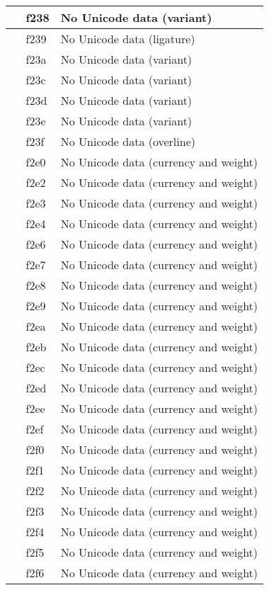 \documentclass[12pt,letterpaper,openany]{book}
\begin{document}
\begin{center}
\begin{supertabular}{|m{0.25in}|m{0.5in}|m{4in}|}
 & f238 & No Unicode data (variant)\\\hline
 & f239 & No Unicode data (ligature)\\\hline
 & f23a & No Unicode data (variant)\\\hline
 & f23c & No Unicode data (variant)\\\hline
 & f23d & No Unicode data (variant)\\\hline
 & f23e & No Unicode data (variant)\\\hline
 & f23f & No Unicode data (overline)\\\hline
 & f2e0 & No Unicode data (currency and weight)\\\hline
 & f2e2 & No Unicode data (currency and weight)\\\hline
 & f2e3 & No Unicode data (currency and weight)\\\hline
 & f2e4 & No Unicode data (currency and weight)\\\hline
 & f2e6 & No Unicode data (currency and weight)\\\hline
 & f2e7 & No Unicode data (currency and weight)\\\hline
 & f2e8 & No Unicode data (currency and weight)\\\hline
 & f2e9 & No Unicode data (currency and weight)\\\hline
 & f2ea & No Unicode data (currency and weight)\\\hline
 & f2eb & No Unicode data (currency and weight)\\\hline
 & f2ec & No Unicode data (currency and weight)\\\hline
 & f2ed & No Unicode data (currency and weight)\\\hline
 & f2ee & No Unicode data (currency and weight)\\\hline
 & f2ef & No Unicode data (currency and weight)\\\hline
 & f2f0 & No Unicode data (currency and weight)\\\hline
 & f2f1 & No Unicode data (currency and weight)\\\hline
 & f2f2 & No Unicode data (currency and weight)\\\hline
 & f2f3 & No Unicode data (currency and weight)\\\hline
 & f2f4 & No Unicode data (currency and weight)\\\hline
 & f2f5 & No Unicode data (currency and weight)\\\hline
 & f2f6 & No Unicode data (currency and weight)\\\hline

\end{supertabular}
\end{center}
\end{document}
